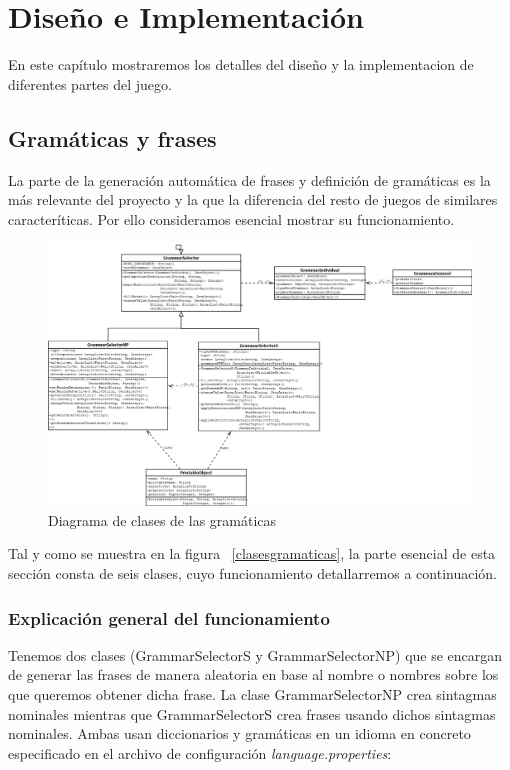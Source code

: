 \chapter{Diseño e Implementación}

En este capítulo mostraremos los detalles del diseño y la implementacion de diferentes partes del juego.

\section{Gramáticas y frases}

La parte de la generación automática de frases y definición de gramáticas es la más relevante del proyecto y la que la diferencia del resto de juegos de similares caracteríticas. Por ello consideramos esencial mostrar su funcionamiento.

\begin{figure}
    \includegraphics[width=\textwidth,height=\textheight,keepaspectratio,angle=90]{./img/grammarDiagram.png}
  \caption{Diagrama de clases de las gramáticas}
  \label{fig:clasesgramaticas}
\end{figure}

Tal y como se muestra en la figura ~\ref{clasesgramaticas}, la parte esencial de esta sección consta de seis clases, cuyo funcionamiento detallarremos a continuación.

\subsection{Explicación general del funcionamiento}

Tenemos dos clases (GrammarSelectorS y GrammarSelectorNP) que se encargan de generar las frases de manera aleatoria en base al nombre o nombres sobre los que queremos obtener dicha frase. La clase GrammarSelectorNP crea sintagmas nominales mientras que GrammarSelectorS crea frases usando dichos sintagmas nominales. Ambas usan diccionarios y gramáticas en un idioma en concreto especificado en el archivo de configuración \textit{language.properties}:

